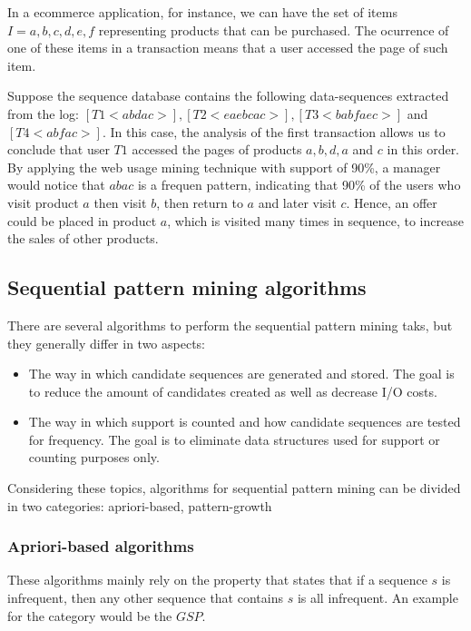 In a ecommerce application, for instance, we can have the set of items $I = {a, b, c, d, e, f}$ representing products that can be purchased. The ocurrence of one of these items in a transaction means that a user accessed the page of such item.

Suppose the sequence database contains the following data-sequences extracted from the log: $[T1 <abdac>], [T2 <eaebcac>], [T3 <babfaec>]$ and $[T4 <abfac>]$. In this case, the analysis of the first transaction allows us to conclude that user $T1$ accessed the pages of products $a,b,d,a$ and $c$ in this order. By applying the web usage mining technique with support of 90\%, a manager would notice that $abac$ is a frequen pattern, indicating that 90\% of the users who visit product $a$ then visit $b$, then return to $a$ and later visit $c$. Hence, an offer could be placed in product $a$, which is visited many times in sequence, to increase the sales of other products. 


\subsection{Sequential pattern mining algorithms}

There are several algorithms to perform the sequential pattern mining taks, but they generally differ in two aspects\cite{Nizar}:

\begin{itemize}

\item The way in which candidate sequences are generated and stored. The goal is to reduce the amount of candidates created as well as decrease I/O costs.

\item The way in which support is counted and how candidate sequences are tested for frequency. The goal is to eliminate data structures used for support or counting purposes only.

\end{itemize}

Considering these topics, algorithms for sequential pattern mining can be divided in two categories: apriori-based, pattern-growth

\subsubsection{Apriori-based algorithms}

These algorithms mainly rely on the property that states that if a sequence $s$ is infrequent, then any other sequence that contains $s$ is all infrequent. An example for the category would be the $GSP$\cite{Rakesh}.

